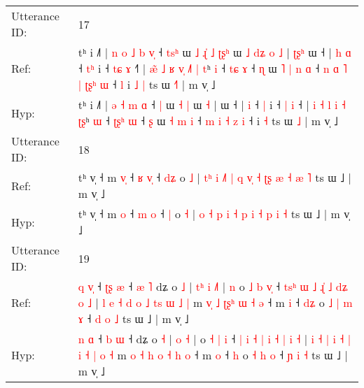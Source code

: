 \documentclass[10pt]{article}
\DeclareRobustCommand{\hl}[1]{{\textcolor{red}{#1}}}
\begin{document}
\begin{longtable}{ll}
\midrule
Utterance ID: & 17 \\
Ref: & tʰ i ˩˥ |\hl{ }\hl{n} \hl{o} \hl{˩} \hl{b} \hl{v}\hl{̩} ˧ \hl{t}\hl{s}\hl{ʰ} ɯ\hl{ }\hl{˩}\hl{ }\hl{ɻ}\hl{̍} \hl{˩} \hl{ʈ}\hl{ʂ}\hl{ʰ} ɯ\hl{ }\hl{˩}\hl{ }\hl{d}\hl{ʑ}\hl{ }\hl{o} \hl{˩} |\hl{ }\hl{ʈ}\hl{ʂ}\hl{ʰ} ɯ ˧ |\hl{ }\hl{h} \hl{ɑ} ˧ \hl{t}\hl{ʰ} i ˧ \hl{t}\hl{ɕ} \hl{ɤ} ˧\hl{˥} | \hl{æ}\hl{̃} \hl{˩} \hl{ʁ} \hl{v}\hl{̩} \hl{˩}\hl{˥} \hl{|}\hl{ }\hl{t}ʰ \hl{i} ˧ \hl{}\hl{t}\hl{ɕ} \hl{ɤ} ˧ \hl{ɳ} ɯ\hl{ }\hl{˥} \hl{|} \hl{n} \hl{ɑ} ˧\hl{ }\hl{n} \hl{ɑ} \hl{˥} \hl{|} \hl{ʈ}\hl{ʂ}\hl{ʰ} \hl{ɯ} ˧\hl{ }\hl{l} i\hl{ }\hl{˩} \hl{|} ts ɯ \hl{˧}\hl{˥} | m v̩ ˩
 \\
Hyp: & tʰ i ˩˥ |\hl{}\hl{} \hl{ə} \hl{˧} \hl{m} \hl{}\hl{ɑ} ˧ \hl{}\hl{}\hl{|} ɯ\hl{}\hl{}\hl{}\hl{}\hl{} \hl{˧} \hl{}\hl{}\hl{|} ɯ\hl{}\hl{}\hl{}\hl{}\hl{}\hl{}\hl{} \hl{˧} |\hl{}\hl{}\hl{}\hl{} ɯ ˧ |\hl{}\hl{} \hl{i} ˧ \hl{}\hl{|} i ˧ \hl{}\hl{|} \hl{i} ˧\hl{} | \hl{}\hl{i} \hl{˧} \hl{l} \hl{}\hl{i} \hl{}\hl{˧} \hl{}\hl{ʈ}\hl{ʂ}ʰ \hl{ɯ} ˧ \hl{ʈ}\hl{ʂ}\hl{ʰ} \hl{ɯ} ˧ \hl{ʂ} ɯ\hl{}\hl{} \hl{˧} \hl{m} \hl{i} ˧\hl{}\hl{} \hl{m} \hl{i} \hl{˧} \hl{}\hl{}\hl{z} \hl{i} ˧\hl{}\hl{} i\hl{}\hl{} \hl{˧} ts ɯ \hl{}\hl{˩} | m v̩ ˩
 \\
\midrule
Utterance ID: & 18 \\
Ref: & tʰ v̩ ˧ m \hl{v}\hl{̩} ˧ \hl{ʁ} \hl{v}\hl{̩} ˧ \hl{d}\hl{ʑ} o \hl{˩} |\hl{ }\hl{t}\hl{ʰ} \hl{i} \hl{˩}\hl{˥} \hl{|} \hl{q} \hl{v}\hl{̩} \hl{˧} \hl{ʈ}\hl{ʂ} \hl{æ} \hl{˧} \hl{æ} \hl{˥} ts ɯ ˩ | m v̩ ˩
 \\
Hyp: & tʰ v̩ ˧ m \hl{}\hl{o} ˧ \hl{m} \hl{}\hl{o} ˧ \hl{}\hl{|} o \hl{˧} |\hl{}\hl{}\hl{} \hl{o} \hl{}\hl{˧} \hl{p} \hl{i} \hl{}\hl{˧} \hl{p} \hl{}\hl{i} \hl{˧} \hl{p} \hl{i} \hl{˧} ts ɯ ˩ | m v̩ ˩
 \\
\midrule
Utterance ID: & 19 \\
Ref: & \hl{q} \hl{v}\hl{̩} ˧ \hl{ʈ}\hl{ʂ} \hl{æ} ˧\hl{ }\hl{æ}\hl{ }\hl{˥} dʑ o \hl{˩} |\hl{ }\hl{t}\hl{ʰ} \hl{i} \hl{˩}\hl{˥} |\hl{ }\hl{n} o \hl{˩} \hl{b} \hl{v}\hl{̩} ˧ \hl{t}\hl{s}\hl{ʰ} \hl{ɯ} \hl{˩} \hl{ɻ}\hl{̍} \hl{˩} \hl{d}\hl{ʑ} \hl{o} \hl{˩} | \hl{l} \hl{e} \hl{˧} \hl{d} \hl{o} \hl{˩} \hl{}\hl{t}\hl{s} \hl{ɯ} \hl{˩} \hl{|} m \hl{v}\hl{̩} \hl{˩} \hl{ʈ}\hl{ʂ}\hl{ʰ} \hl{ɯ} \hl{˧} \hl{ə} ˧ m \hl{i} ˧ \hl{d}\hl{ʑ} o\hl{ }\hl{˩} \hl{|} \hl{m} \hl{ɤ} ˧ \hl{d} \hl{o} \hl{˩} ts ɯ ˩ | m v̩ ˩
 \\
Hyp: & \hl{n} \hl{}\hl{ɑ} ˧ \hl{}\hl{b} \hl{ɯ} ˧\hl{}\hl{}\hl{}\hl{} dʑ o \hl{˧} |\hl{}\hl{}\hl{} \hl{o} \hl{}\hl{˧} |\hl{}\hl{} o \hl{˧} \hl{|} \hl{}\hl{i} ˧ \hl{|}\hl{ }\hl{i} \hl{˧} \hl{|} \hl{}\hl{i} \hl{˧} \hl{}\hl{|} \hl{i} \hl{˧} | \hl{i} \hl{˧} \hl{|} \hl{i} \hl{˧} \hl{|} \hl{i}\hl{ }\hl{˧} \hl{|} \hl{o} \hl{˧} m \hl{}\hl{o} \hl{˧} \hl{h}\hl{ }\hl{o} \hl{˧} \hl{h} \hl{o} ˧ m \hl{o} ˧ \hl{}\hl{h} o\hl{}\hl{} \hl{˧} \hl{h} \hl{o} ˧ \hl{ɲ} \hl{i} \hl{˧} ts ɯ ˩ | m v̩ ˩

\end{longtable}
\end{document}
